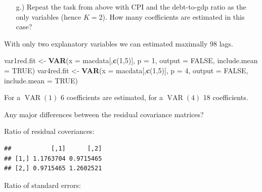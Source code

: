\documentclass[12pt,a4paper]{article}
\newcommand{\VAR}{\operatorname{VAR}} %
\newenvironment{Shaded}{\begin{snugshade}}{\end{snugshade}}
\newcommand{\DataTypeTok}[1]{\textcolor[rgb]{0.13,0.29,0.53}{#1}}
\newcommand{\DecValTok}[1]{\textcolor[rgb]{0.00,0.00,0.81}{#1}}
\newcommand{\KeywordTok}[1]{\textcolor[rgb]{0.13,0.29,0.53}{\textbf{#1}}}
\newcommand{\NormalTok}[1]{#1}
\newcommand{\OperatorTok}[1]{\textcolor[rgb]{0.81,0.36,0.00}{\textbf{#1}}}
\newcommand{\OtherTok}[1]{\textcolor[rgb]{0.56,0.35,0.01}{#1}}
\newcommand{\StringTok}[1]{\textcolor[rgb]{0.31,0.60,0.02}{#1}}
\begin{document}
\begin{itemize}
  \item[g.)]  Repeat the task from above with CPI and the debt-to-gdp ratio as the only variables (hence $K = 2$). How many coefficients are estimated in this case?
\end{itemize}

With only two explanatory variables we can estimated maximally 98 lags.

\begin{Shaded}
\begin{Highlighting}[]
\NormalTok{var1red.fit <-}\StringTok{ }\KeywordTok{VAR}\NormalTok{(}\DataTypeTok{x =}\NormalTok{ macdata[,}\KeywordTok{c}\NormalTok{(}\DecValTok{1}\NormalTok{,}\DecValTok{5}\NormalTok{)], }\DataTypeTok{p =} \DecValTok{1}\NormalTok{, }\DataTypeTok{output =} \OtherTok{FALSE}\NormalTok{, }\DataTypeTok{include.mean =} \OtherTok{TRUE}\NormalTok{)}
\NormalTok{var4red.fit <-}\StringTok{ }\KeywordTok{VAR}\NormalTok{(}\DataTypeTok{x =}\NormalTok{ macdata[,}\KeywordTok{c}\NormalTok{(}\DecValTok{1}\NormalTok{,}\DecValTok{5}\NormalTok{)], }\DataTypeTok{p =} \DecValTok{4}\NormalTok{, }\DataTypeTok{output =} \OtherTok{FALSE}\NormalTok{, }\DataTypeTok{include.mean =} \OtherTok{TRUE}\NormalTok{)}
\end{Highlighting}
\end{Shaded}

For a \(\VAR(1)\) 6 coefficients are estimated, for a \(\VAR(4)\) 18
coefficients.

Any major differences between the residual covariance matrices?

Ratio of residual coveriances:

\begin{Shaded}
\end{Shaded}

\begin{verbatim}
##           [,1]      [,2]
## [1,] 1.1763704 0.9715465
## [2,] 0.9715465 1.2602521
\end{verbatim}

Ratio of standard errors:

\begin{Shaded}
\end{Shaded}
\end{document}
